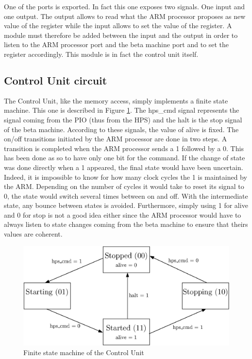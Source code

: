 One of the ports is exported. In fact this one exposes two signals. One input and one output. The 
output allows to read what the ARM processor proposes as new value of the register while the input 
allows to set the value of the register. A module must therefore be added between the input and the 
output in order to listen to the ARM processor port and the beta machine port and to set the 
register accordingly. This module is in fact the control unit itself.

\subsection{Control Unit circuit}

The Control Unit, like the memory access, simply implements a finite state machine. This one is 
described in Figure \ref{fig:ctrlu/fsm}. The hps\_cmd signal represents the signal coming from the 
PIO (thus from the HPS) and the halt is the stop signal of the beta machine. According to these 
signals, the value of alive is fixed. The on/off transitions initiated by the ARM processor are 
done in two steps. A transition is completed when the ARM processor sends a 1 followed by a 0. This 
has been done as so to have only one bit for the command. If the change of state was done directly 
when a 1 appeared, the final state would have been uncertain. Indeed, it is impossible to know for 
how many clock cycles the 1 is maintained by the ARM. Depending on the number of cycles it would 
take to reset its signal to 0, the state would switch several times between on and off. With 
the intermediate state, any bounce between states is avoided. Furthermore, simply using 1 for alive and 0 for
stop is not a good idea either since the ARM processor would have to always listen to state changes
coming from the beta machine to ensure that theirs values are coherent.

\begin{figure}[ht!]
    \center
    \includegraphics[scale=0.8]{"Chapter5-MAU_CTRLU/res/ctrlu_fsm"}
    \caption{Finite state machine of the Control Unit}
    \label{fig:ctrlu/fsm}
\end{figure}

